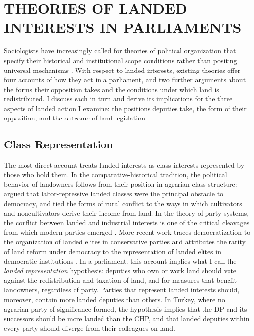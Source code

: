 \documentclass[12pt]{article}
\begin{document}
\section*{THEORIES OF LANDED INTERESTS IN PARLIAMENTS}

Sociologists have increasingly called for theories of political organization that specify their historical and institutional scope conditions rather than positing universal mechanisms \citep{mudge2014}. With respect to landed interests, existing theories offer four accounts of how they act in a parliament, and two further arguments about the forms their opposition takes and the conditions under which land is redistributed. I discuss each in turn and derive its implications for the three aspects of landed action I examine: the positions deputies take, the form of their opposition, and the outcome of land legislation.

\subsection*{Class Representation}

The most direct account treats landed interests as class interests represented by those who hold them. In the comparative-historical tradition, the political behavior of landowners follows from their position in agrarian class structure: \citet{moore1966} argued that labor-repressive landed classes were the principal obstacle to democracy, and \citet{paige1975} tied the forms of rural conflict to the ways in which cultivators and noncultivators derive their income from land. In the theory of party systems, the conflict between landed and industrial interests is one of the critical cleavages from which modern parties emerged \citep{lipset1967}. More recent work traces democratization to the organization of landed elites in conservative parties \citep{ziblatt2017} and attributes the rarity of land reform under democracy to the representation of landed elites in democratic institutions \citep{albertus2015}. In a parliament, this account implies what I call the \textit{landed representation} hypothesis: deputies who own or work land should vote against the redistribution and taxation of land, and for measures that benefit landowners, regardless of party. Parties that represent landed interests should, moreover, contain more landed deputies than others. In Turkey, where no agrarian party of significance formed, the hypothesis implies that the DP and its successors should be more landed than the CHP, and that landed deputies within every party should diverge from their colleagues on land.
\end{document}
